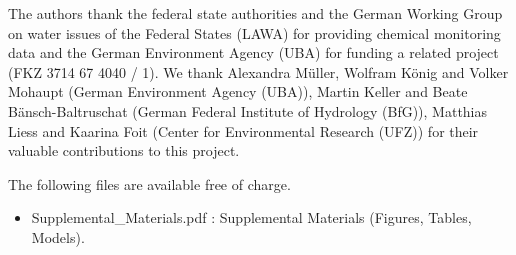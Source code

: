 \documentclass[journal=esthag,manuscript=article]{achemso}
\begin{document}
\begin{acknowledgement}
The authors thank the federal state authorities and the German Working Group on water issues of the Federal States (LAWA) for providing chemical monitoring data and the German Environment Agency (UBA) for funding a related project (FKZ 3714 67 4040 / 1). 
We thank Alexandra Müller, Wolfram König and Volker Mohaupt (German Environment Agency (UBA)), Martin Keller and Beate Bänsch-Baltruschat (German Federal Institute of Hydrology (BfG)), Matthias Liess and Kaarina Foit (Center for Environmental Research (UFZ)) for their valuable contributions to this project. 
\end{acknowledgement}



\begin{suppinfo}
The following files are available free of charge.
\begin{itemize}
  \item Supplemental\_Materials.pdf : Supplemental Materials (Figures, Tables, Models).
\end{itemize}
\end{suppinfo}



\end{document}
